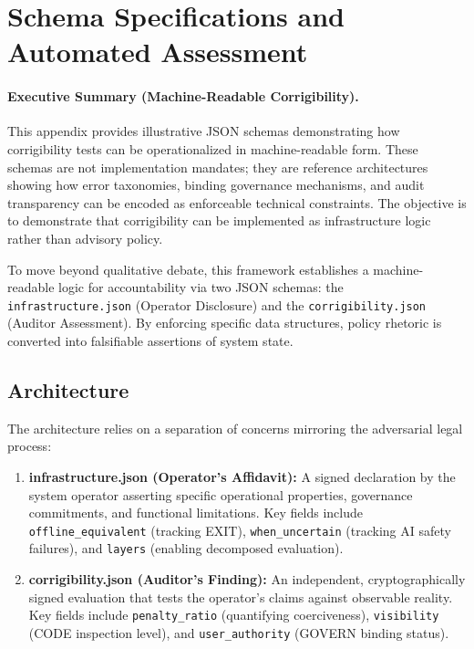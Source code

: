 \documentclass{article}
\begin{document}
\section{Schema Specifications and Automated Assessment}
\label{appendix:schema}

\paragraph{Executive Summary (Machine-Readable Corrigibility).}
This appendix provides illustrative JSON schemas demonstrating how corrigibility tests can be operationalized in machine-readable form. These schemas are not implementation mandates; they are reference architectures showing how error taxonomies, binding governance mechanisms, and audit transparency can be encoded as enforceable technical constraints. The objective is to demonstrate that corrigibility can be implemented as infrastructure logic rather than advisory policy.

\medskip

To move beyond qualitative debate, this framework establishes a machine-readable logic for accountability via two JSON schemas: the \texttt{infrastructure.json} (Operator Disclosure) and the \texttt{corrigibility.json} (Auditor Assessment). By enforcing specific data structures, policy rhetoric is converted into falsifiable assertions of system state.

\subsection{Architecture}

The architecture relies on a separation of concerns mirroring the adversarial legal process:

\begin{enumerate}[noitemsep]
    \item \textbf{infrastructure.json (Operator's Affidavit):} A signed declaration by the system operator asserting specific operational properties, governance commitments, and functional limitations. Key fields include \texttt{offline\_equivalent} (tracking EXIT), \texttt{when\_uncertain} (tracking AI safety failures), and \texttt{layers} (enabling decomposed evaluation).

    \item \textbf{corrigibility.json (Auditor's Finding):} An independent, cryptographically signed evaluation that tests the operator's claims against observable reality. Key fields include \texttt{penalty\_ratio} (quantifying coerciveness), \texttt{visibility} (CODE inspection level), and \texttt{user\_authority} (GOVERN binding status).
\end{enumerate}
\end{document}
